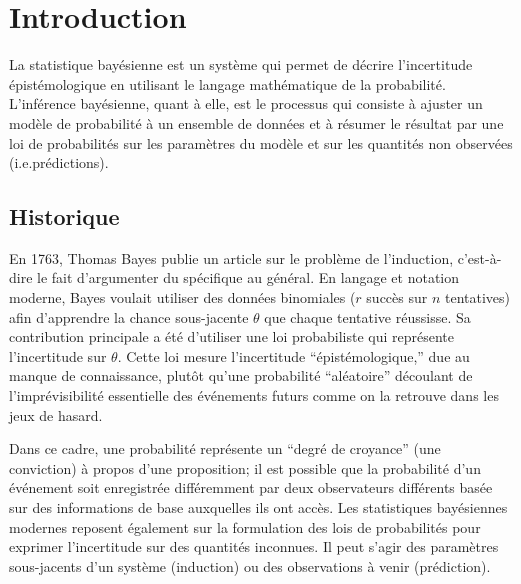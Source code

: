 \section{Introduction}
La statistique bayésienne est un système qui permet de décrire l'incertitude épistémologique en utilisant le langage mathématique de la probabilité. L'inférence bayésienne, quant \`a elle, est le processus qui consiste à ajuster un mo\-dè\-le de probabilité à un ensemble de données et à résumer le résultat par une loi de probabilités sur les paramètres du modèle et sur les quantités non observées (i.e.\@  prédictions).
\subsection{Historique} %
En 1763, Thomas Bayes publie un article sur le problème de l'induction, c'est-à-dire le fait d'argumenter du spécifique au général. En langage et notation moderne, Bayes voulait utiliser des données binomiales ($r$ succès sur $n$ tentatives) afin d'apprendre la chance sous-jacente $\theta$ que chaque tentative réussisse. Sa contribution principale a été d'utiliser une loi probabiliste qui représente l'incertitude sur $\theta$. Cette loi mesure l'incertitude ``épistémologique,'' due au manque de connaissance, plutôt qu'une probabilité ``aléatoire'' découlant de l'imprévisibilité essentielle des événements futurs comme on la retrouve dans les jeux de hasard. 
\par Dans ce cadre, une probabilité représente un ``degré de croyance'' (une conviction) à propos d'une proposition; il est possible que la probabilité d'un événement soit enregistrée différemment par deux observateurs différents basée sur des informations de base auxquelles ils ont accès. \newl Les statistiques bayésiennes modernes reposent \'egalement sur la formulation des lois de probabilités pour exprimer l'incertitude sur des quantités inconnues. Il peut s'agir des paramètres sous-jacents d'un système (induction) ou des observations à venir (prédiction).

